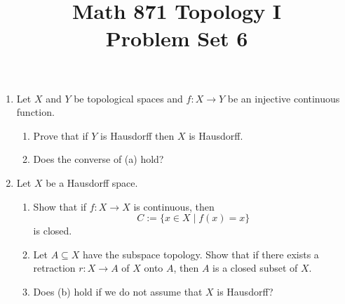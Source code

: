 \documentclass[12pt]{article}
\title{Math 871 Topology I\\[-0.1em]
\large Problem Set 6}
\author{}
\date{}
\theoremstyle{definition}
\begin{document}
\maketitle


	
\thispagestyle{fancy}
\pagestyle{fancy}




\begin{enumerate}[roomy]

\item Let $X$ and $Y$ be topological spaces and $f \colon X \to Y$ be an injective continuous function.

\begin{enumerate}
\item Prove that if $Y$ is Hausdorff then $X$ is Hausdorff.
\item Does the converse of (a) hold?
\end{enumerate}


\item Let $X$ be a Hausdorff space. 

\begin{enumerate}
\item Show that if $f \colon X \to X$ is continuous, then 
\[ C := \{ x \in X  \mid f(x) = x \}\]
is closed.

\item Let $A \subseteq X$ have the subspace topology. 
Show that if there exists a retraction $r \colon X \longrightarrow A$ of $X$ onto $A$, then $A$ is a closed subset of $X$.

\item Does (b) hold if we do not assume that $X$ is Hausdorff?
\end{enumerate}



\end{enumerate}
\end{document}
